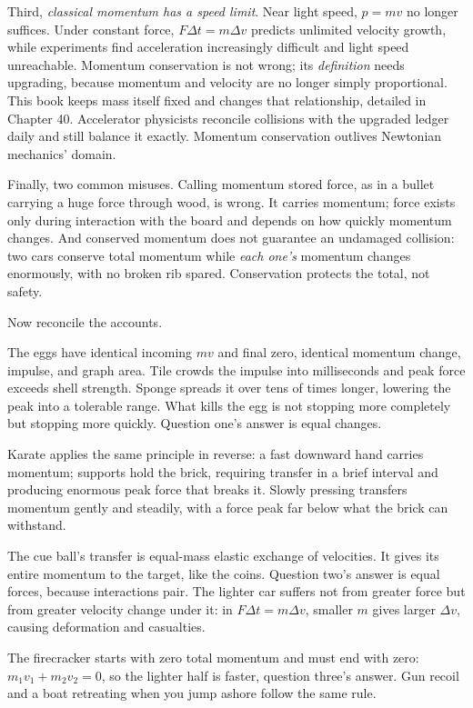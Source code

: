 Third, \emph{classical momentum has a speed limit}. Near light speed, \(p=mv\) no longer suffices. Under constant force, \(F\Delta t=m\Delta v\) predicts unlimited velocity growth, while experiments find acceleration increasingly difficult and light speed unreachable. Momentum conservation is not wrong; its \emph{definition} needs upgrading, because momentum and velocity are no longer simply proportional. This book keeps mass itself fixed and changes that relationship, detailed in Chapter 40. Accelerator physicists reconcile collisions with the upgraded ledger daily and still balance it exactly. Momentum conservation outlives Newtonian mechanics' domain.

Finally, two common misuses. Calling momentum stored force, as in a bullet carrying a huge force through wood, is wrong. It carries momentum; force exists only during interaction with the board and depends on how quickly momentum changes. And conserved momentum does not guarantee an undamaged collision: two cars conserve total momentum while \emph{each one's} momentum changes enormously, with no broken rib spared. Conservation protects the total, not safety.


Now reconcile the accounts.

The eggs have identical incoming \(mv\) and final zero, identical momentum change, impulse, and graph area. Tile crowds the impulse into milliseconds and peak force exceeds shell strength. Sponge spreads it over tens of times longer, lowering the peak into a tolerable range. What kills the egg is not stopping more completely but stopping more quickly. Question one's answer is equal changes.

Karate applies the same principle in reverse: a fast downward hand carries momentum; supports hold the brick, requiring transfer in a brief interval and producing enormous peak force that breaks it. Slowly pressing transfers momentum gently and steadily, with a force peak far below what the brick can withstand.

The cue ball's transfer is equal-mass elastic exchange of velocities. It gives its entire momentum to the target, like the coins. Question two's answer is equal forces, because interactions pair. The lighter car suffers not from greater force but from greater velocity change under it: in \(F\Delta t=m\Delta v\), smaller \(m\) gives larger \(\Delta v\), causing deformation and casualties.

The firecracker starts with zero total momentum and must end with zero: \(m_1v_1+m_2v_2=0\), so the lighter half is faster, question three's answer. Gun recoil and a boat retreating when you jump ashore follow the same rule.

